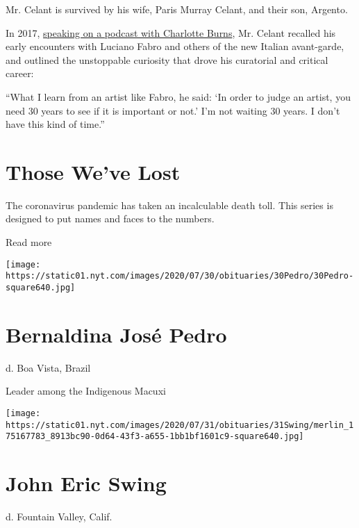 Mr. Celant is survived by his wife, Paris Murray Celant, and their son,
Argento.

In 2017,
\href{https://www.artagencypartners.com/episode-19-transcript-germano-celant-and-allan-schwartzman/}{speaking
on a podcast with Charlotte Burns}, Mr. Celant recalled his early
encounters with Luciano Fabro and others of the new Italian avant-garde,
and outlined the unstoppable curiosity that drove his curatorial and
critical career:

``What I learn from an artist like Fabro, he said: `In order to judge an
artist, you need 30 years to see if it is important or not.' I'm not
waiting 30 years. I don't have this kind of time.''

\href{https://www.nytimes.com/interactive/2020/obituaries/people-died-coronavirus-obituaries.html?action=click\&pgtype=Article\&state=default\&region=BELOW_MAIN_CONTENT\&context=covid_obits_promo}{}

\hypertarget{those-weve-lost}{%
\section{Those We've Lost}\label{those-weve-lost}}

The coronavirus pandemic has taken an incalculable death toll. This
series is designed to put names and faces to the numbers.

Read more

\texttt{[image: https://static01.nyt.com/images/2020/07/30/obituaries/30Pedro/30Pedro-square640.jpg]}

\hypertarget{bernaldina-josuxe9-pedro}{%
\section{Bernaldina José Pedro}\label{bernaldina-josuxe9-pedro}}

d. Boa Vista, Brazil

Leader among the Indigenous Macuxi

\texttt{[image: https://static01.nyt.com/images/2020/07/31/obituaries/31Swing/merlin\_175167783\_8913bc90-0d64-43f3-a655-1bb1bf1601c9-square640.jpg]}

\hypertarget{john-eric-swing}{%
\section{John Eric Swing}\label{john-eric-swing}}

d. Fountain Valley, Calif.

